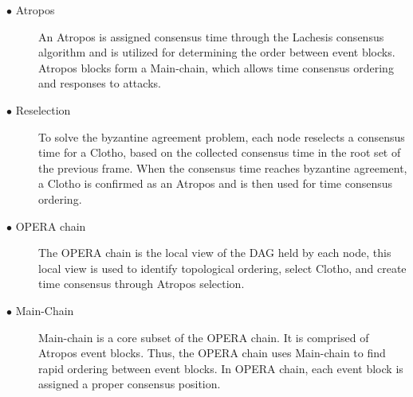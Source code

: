 \documentclass[preprint,12pt]{elsarticle}
\begin{document}
\begin{description}
	\item[$\bullet$ Atropos] An Atropos is assigned consensus time through the Lachesis consensus algorithm and is utilized for determining the order between event blocks. Atropos blocks form a Main-chain, which allows time consensus ordering and responses to attacks.
	\item[$\bullet$ Reselection] To solve the byzantine agreement problem, each node reselects a consensus time for a Clotho, based on the collected consensus time in the root set of the previous frame. When the consensus time reaches byzantine agreement, a Clotho is confirmed as an Atropos and is then used for time consensus ordering.
	\item[$\bullet$ OPERA chain] The OPERA chain is the local view of the DAG held by each node, this local view is used to identify topological ordering, select Clotho, and create time consensus through Atropos selection.
	\item[$\bullet$ Main-Chain] Main-chain is a core subset of the OPERA chain. It is comprised of Atropos event blocks. Thus, the OPERA chain uses Main-chain to find rapid ordering between event blocks. In OPERA chain, each event block is assigned a proper consensus position.
\end{description}
\end{document}
